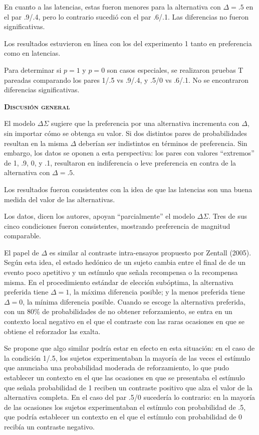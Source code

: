\documentclass[a4paper,12pt]{article}
\begin{document}
En cuanto a las latencias, estas fueron menores para la alternativa con $\Delta={.}5$ en el par .9/.4, pero lo contrario sucedió con el par .6/.1. Las diferencias no fueron significativas.

Los resultados estuvieron en línea con los del experimento 1 tanto en preferencia como en latencias.

Para determinar si $p=1$ y $p=0$ son casos especiales, se realizaron pruebas T pareadas comparando los pares 1/.5 vs .9/.4, y .5/0 vs .6/.1. No se encontraron diferencias significativas.

{\scshape\bfseries Discusión general}

El modelo $\Delta\Sigma$ sugiere que la preferencia por una alternativa incrementa con $\Delta$, sin importar cómo se obtenga su valor. Si dos distintos pares de probabilidades resultan en la misma $\Delta$ deberían ser indistintos en términos de preferencia. Sin embargo, los datos se oponen a esta perspectiva: los pares con valores ``extremos'' de 1, .9, 0, y .1, resultaron en indiferencia o leve preferencia en contra de la alternativa con $\Delta={.}5$.

Los resultados fueron consistentes con la idea de que las latencias son una buena medida del valor de las alternativas.

Los datos, dicen los autores, apoyan ``parcialmente'' el modelo $\Delta\Sigma$. Tres de sus cinco condiciones fueron consistentes, mostrando preferencia de magnitud comparable.

El papel de $\Delta$ es similar al contraste intra-ensayos propuesto por Zentall (2005). Según esta idea, el estado hedónico de un sujeto cambia entre el final de de un evento poco apetitivo y un estímulo que señala recompensa o la recompensa misma. En el procedimiento estándar de elección subóptima, la alternativa preferida tiene $\Delta=1$, la máxima diferencia posible; y la menos preferida tiene $\Delta=0$, la mínima diferencia posible. Cuando se escoge la alternativa preferida, con un 80\% de probabilidades de no obtener reforzamiento, se entra en un contexto local negativo en el que el contraste con las raras ocasiones en que se obtiene el reforzador las exalta.

Se propone que algo similar podría estar en efecto en esta situación: en el caso de la condición 1/.5, los sujetos experimentaban la mayoría de las veces el estímulo que anunciaba una probabilidad moderada de reforzamiento, lo que pudo establecer un contexto en el que las ocasiones en que se presentaba el estímulo que señala probabilidad de 1 reciben un contraste positivo que alza el valor de la alternativa completa. En el caso del par .5/0 sucedería lo contrario: en la mayoría de las ocasiones los sujetos experimentaban el estímulo con probabilidad de .5, que podría establecer un contexto en el que el estímulo con probabilidad de 0 recibía un contraste negativo.
\end{document}
